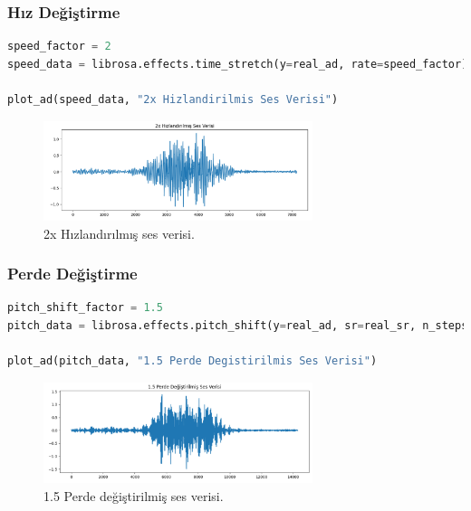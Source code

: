 \subsubsection{Hız Değiştirme}

\begin{lstlisting}[language=Python]
speed_factor = 2
speed_data = librosa.effects.time_stretch(y=real_ad, rate=speed_factor)

plot_ad(speed_data, "2x Hizlandirilmis Ses Verisi")
\end{lstlisting}

\begin{figure}[h]
    \centering
    \includegraphics[width=0.7\textwidth]{images/sound_aug_04.png}
    \caption{2x Hızlandırılmış ses verisi.}
    \label{fig:enter-label}
\end{figure}

\newpage

\subsubsection{Perde Değiştirme}

\begin{lstlisting}[language=Python]
pitch_shift_factor = 1.5
pitch_data = librosa.effects.pitch_shift(y=real_ad, sr=real_sr, n_steps=pitch_shift_factor)

plot_ad(pitch_data, "1.5 Perde Degistirilmis Ses Verisi")
\end{lstlisting}

\begin{figure}[h]
    \centering
    \includegraphics[width=0.7\textwidth]{images/sound_aug_05.png}
    \caption{1.5 Perde değiştirilmiş ses verisi.}
    \label{fig:enter-label}
\end{figure}

